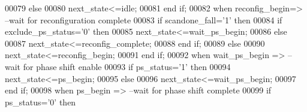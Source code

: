 \begin{DoxyCode}
00079             \textcolor{keywordflow}{else} 
00080                 \textcolor{vhdlchar}{next_state}\textcolor{vhdlchar}{<=}\textcolor{vhdlchar}{idle};
00081             \textcolor{keywordflow}{end} \textcolor{keywordflow}{if};
00082         \textcolor{keywordflow}{when} \textcolor{vhdlchar}{reconfig\_begin}\textcolor{vhdlchar}{=}\textcolor{vhdlchar}{>}\textcolor{keyword}{ --wait for reconfiguration complete}
00083             \textcolor{keywordflow}{if} \textcolor{vhdlchar}{scandone_fall}\textcolor{vhdlchar}{=}\textcolor{vhdlchar}{'}\textcolor{vhdllogic}{}\textcolor{vhdllogic}{1}\textcolor{vhdlchar}{'} \textcolor{keywordflow}{then} 
00084                 \textcolor{keywordflow}{if} \textcolor{vhdlchar}{exclude_ps_status}\textcolor{vhdlchar}{=}\textcolor{vhdlchar}{'}\textcolor{vhdllogic}{}\textcolor{vhdllogic}{0}\textcolor{vhdlchar}{'} \textcolor{keywordflow}{then} 
00085                     \textcolor{vhdlchar}{next_state}\textcolor{vhdlchar}{<=}\textcolor{vhdlchar}{wait\_ps\_begin};
00086                 \textcolor{keywordflow}{else} 
00087                     \textcolor{vhdlchar}{next_state}\textcolor{vhdlchar}{<=}\textcolor{vhdlchar}{reconfig\_complete};
00088                 \textcolor{keywordflow}{end} \textcolor{keywordflow}{if};
00089             \textcolor{keywordflow}{else} 
00090                 \textcolor{vhdlchar}{next_state}\textcolor{vhdlchar}{<=}\textcolor{vhdlchar}{reconfig\_begin};
00091             \textcolor{keywordflow}{end} \textcolor{keywordflow}{if};
00092         \textcolor{keywordflow}{when} \textcolor{vhdlchar}{wait\_ps\_begin} \textcolor{vhdlchar}{=}\textcolor{vhdlchar}{>}\textcolor{keyword}{ --wait for phase shift enable}
00093             \textcolor{keywordflow}{if} \textcolor{vhdlchar}{ps_status}\textcolor{vhdlchar}{=}\textcolor{vhdlchar}{'}\textcolor{vhdllogic}{}\textcolor{vhdllogic}{1}\textcolor{vhdlchar}{'} \textcolor{keywordflow}{then} 
00094                 \textcolor{vhdlchar}{next_state}\textcolor{vhdlchar}{<=}\textcolor{vhdlchar}{ps\_begin};
00095             \textcolor{keywordflow}{else}
00096                 \textcolor{vhdlchar}{next_state}\textcolor{vhdlchar}{<=}\textcolor{vhdlchar}{wait\_ps\_begin};
00097             \textcolor{keywordflow}{end} \textcolor{keywordflow}{if};
00098         \textcolor{keywordflow}{when} \textcolor{vhdlchar}{ps\_begin} \textcolor{vhdlchar}{=}\textcolor{vhdlchar}{>}\textcolor{keyword}{        --wait for phase shift complete}
00099             \textcolor{keywordflow}{if} \textcolor{vhdlchar}{ps_status}\textcolor{vhdlchar}{=}\textcolor{vhdlchar}{'}\textcolor{vhdllogic}{}\textcolor{vhdllogic}{0}\textcolor{vhdlchar}{'} \textcolor{keywordflow}{then} 

\end{DoxyCode}
